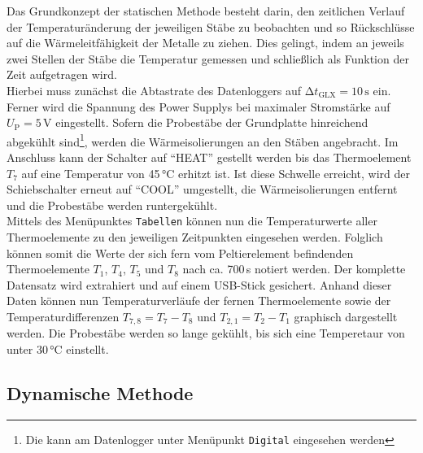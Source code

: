 Das Grundkonzept der statischen Methode besteht darin, den zeitlichen Verlauf der Temperaturänderung der jeweiligen Stäbe zu beobachten und so Rückschlüsse auf die
Wärmeleitfähigkeit der Metalle zu ziehen. Dies gelingt, indem an jeweils zwei Stellen der Stäbe die Temperatur gemessen und schließlich als Funktion der Zeit aufgetragen wird. \\
Hierbei muss zunächst die Abtastrate des Datenloggers auf $\increment t_\text{GLX} = 10\,\unit{\second}$ ein. Ferner wird die Spannung des Power Supplys bei maximaler Stromstärke auf 
$U_\text{P} = 5\,\unit{\volt}$ eingestellt. Sofern die Probestäbe der Grundplatte hinreichend abgekühlt sind\footnote{Die kann am Datenlogger unter Menüpunkt \texttt{Digital} eingesehen werden},
werden die Wärmeisolierungen an den Stäben angebracht. Im Anschluss kann der Schalter auf \enquote{HEAT} gestellt werden bis das Thermoelement $T_7$ auf eine Temperatur von 45\,\unit{\celsius}
erhitzt ist. Ist diese Schwelle erreicht, wird der Schiebschalter erneut auf \enquote{COOL} umgestellt, die Wärmeisolierungen entfernt und die Probestäbe werden runtergekühlt. \\
Mittels des Menüpunktes \texttt{Tabellen} können nun die Temperaturwerte aller Thermoelemente zu den jeweiligen Zeitpunkten eingesehen werden. Folglich können somit die Werte der
sich fern vom Peltierelement befindenden Thermoelemente $T_1$, $T_4$, $T_5$ und $T_8$ nach ca. 700\,\unit{\second} notiert werden. Der komplette Datensatz wird extrahiert und auf einem USB-Stick
gesichert. Anhand dieser Daten können nun Temperaturverläufe der fernen Thermoelemente sowie der Temperaturdifferenzen $T_{7,8} = T_7 - T_8$ und $T_{2,1} = T_2 - T_1$ graphisch dargestellt werden.
Die Probestäbe werden so lange gekühlt, bis sich eine Temperetaur von unter 30\,\unit{\celsius} einstellt.

\subsection{Dynamische Methode}
\label{sec:Dynamische Methode}

